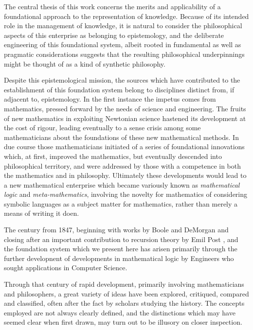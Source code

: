 The central thesis of this work concerns the merits and applicability of a foundational approach to the representation of knowledge.
Because of its intended role in the management of knowledge, it is natural to consider the philosophical aspects of this enterprise as belonging to epistemology, and the deliberate engineering of this foundational system, albeit rooted in fundamental as well as pragmatic considerations suggests that the resulting philosophical underpinnings might be thought of as a kind of synthetic philosophy.

Despite this epistemological mission, the sources which have contributed to the establishment of this foundation system belong to disciplines distinct from, if adjacent to, epistemology.
In the first instance the impetus comes from mathematics, pressed forward by the needs of science and engineering.
The fruits of new mathematics in exploiting Newtonian science hastened its development at the cost of rigour, leading eventually to a sense crisis among some mathematicians about the foundations of these new mathematical methods.
In due course those mathematicians initiated of a series of foundational innovations which, at first, improved the mathematics, but eventually descended into philosophical territory, and were addressed by those with a competence in both the mathematics and in philosophy.
Ultimately these developments would lead to a new mathematical enterprise which became variously known as \emph{mathematical logic} and \emph{meta-mathematics}, involving the novelty for mathematics of considering symbolic languages as a subject matter for mathematics, rather than merely a means of writing it doen.

The century from 1847, beginning with works by Boole \cite{boole1847} and DeMorgan \cite{demorgan1847} and closing after an important contribution to recursion theory by Emil Post \cite{post1944}, and the foundation system which we present here has arisen primarily through the further developnent of developments in mathematical logic by Engineers who sought applications in Computer Science.

Through that century of rapid development, primarily involving mathematicians and philosophers, a great variety of ideas have been explored, critiqued, compared and classified, often after the fact by scholars studying the history.
The concepts employed are not always clearly defined, and the distinctions which may have seemed clear when first drawn, may turn out to be illusory on closer inspection.

